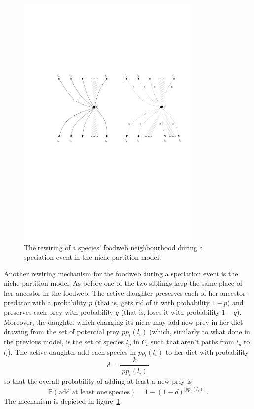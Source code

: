 \documentclass[12pt,a4paper]{report}
\begin{document}
\begin{figure}[h]
	\centering
		\includegraphics[width=0.8\textwidth]{images/fwspec2p}
		\caption{The rewiring of a species' foodweb neighbourhood during a speciation event in the niche partition model.}
		\label{fig:fwspec2p}
\end{figure}

Another rewiring mechanism for the foodweb during a speciation event is the niche partition model. As before one of the two siblings keep the same place of her ancestor in the foodweb. The active daughter preserves each of her ancestor predator with a probability $p$ (that is, gets rid of it with probability $1-p$) and preserves each prey with probability $q$ (that is, loses it with probability $1-q$). Moreover, the daughter which changing its niche may add new prey in her diet drawing from the set of potential prey $pp_{t}(l_i)$ (which, similarly to what done in the previous model, is the set of species $l_p$ in $C_t$ such that aren't paths from $l_p$ to $l_i$). The active daughter add each species in $pp_{t}(l_i)$ to her diet with probability $$d = \frac{k}{|pp_t(l_i)|}$$  so that the overall probability of adding at least a new prey is \[ \mathbb{P}(\mbox{add at least one species}) = 1 - \left( 1 - d\right)^{|pp_t(l_i)|} \, . \]  The mechanism is depicted in figure~\ref{fig:fwspec2p}.
\end{document}
